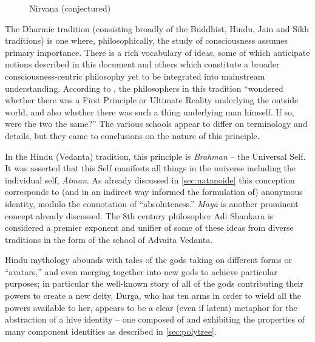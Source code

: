\documentclass[pra,twocolumn,groupedaddress,10pt]{revtex4}
\theoremstyle{definition}
\begin{document}
\begin{figure}[htp]
	\caption{\label{fig:nirvana}Nirvana (conjectured)}
\end{figure}

The Dharmic tradition (consisting broadly of the Buddhist, Hindu, Jain and Sikh traditions) is one where, philosophically, the study of consciousness assumes primary importance. There is a rich vocabulary of ideas, some of which anticipate notions described in this document and others which constitute a broader consciousness-centric philosophy yet to be integrated into mainstream understanding. According to \cite{atmabodha}, the philosophers in this tradition ``wondered whether there was a First Principle or Ultimate Reality underlying the outside world, and also whether there was such a thing underlying man himself. If so, were the two the same?'' The various schools appear to differ on terminology and details, but they came to conclusions on the nature of this principle.

In the Hindu (Vedanta) tradition, this principle is \textit{Brahman} -- the Universal Self. It was asserted that this Self manifests all things in the universe including the individual self, \textit{\={A}tman}. As already discussed in \autoref{sec:natanoide} this conception corresponds to (and in an indirect way informed the formulation of) anonymous identity, modulo the connotation of ``absoluteness.'' \textit{M\={a}y\={a}} is another prominent concept already discussed. The 8th century philosopher Adi Shankara\cite{shankara} is considered a premier exponent and unifier of some of these ideas from diverse traditions in the form of the school of Advaita Vedanta.

Hindu mythology abounds with tales of the gods taking on different forms or ``avatars,'' and even merging together into new gods to achieve particular purposes; in particular the well-known story of all of the gods contributing their powers to create a new deity, Durga, who has ten arms in order to wield all the powers available to her, appears to be a clear (even if latent) metaphor for the abstraction of a hive identity -- one composed of and exhibiting the properties of many component identities as described in \autoref{sec:polytree}.
\end{document}
